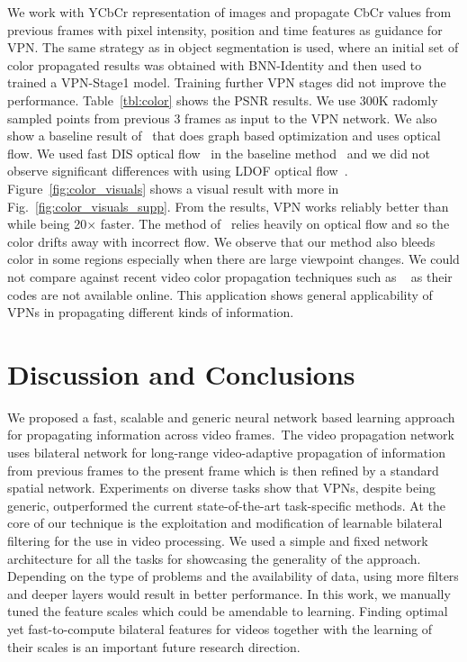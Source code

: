We work with YCbCr representation of images and propagate CbCr values from previous
frames with pixel intensity, position and time features as guidance for VPN.
The same strategy as in object segmentation is used, where an initial
set of color propagated results was obtained with BNN-Identity and then used to trained a VPN-Stage1 model.
Training further VPN stages did not improve the performance.
Table~\ref{tbl:color} shows the PSNR results.
We use 300K radomly sampled points from previous 3 frames as input
to the VPN network. We also show a baseline result of~\cite{levin2004colorization} that
does graph based optimization and uses optical flow. We used fast
DIS optical flow~\cite{kroeger2016fast} in the baseline method~\cite{levin2004colorization}
and we did not observe significant differences with using LDOF optical flow~\cite{brox2009large}.
Figure~\ref{fig:color_visuals} shows a visual result with more
in Fig.~\ref{fig:color_visuals_supp}.
From the results,
VPN works reliably better than~\cite{levin2004colorization} while being 20$\times$ faster.
The method of~\cite{levin2004colorization} relies heavily on optical flow
and so the color drifts away with incorrect flow. We observe that our method also bleeds color
in some regions especially when there are large viewpoint changes.
We could not compare against recent video color propagation techniques such as
~\cite{heu2009image,sheng2014video} as their codes are not available online.
This application shows general applicability of VPNs in propagating different
kinds of information.

\vspace{-0.3cm}
\section{Discussion and Conclusions}
\label{sec:conclusion}

We proposed a fast, scalable and generic neural network based learning approach
for propagating information across video frames.~The video propagation network uses
bilateral network for long-range video-adaptive propagation of information from previous
frames to the present frame which is then refined by a standard spatial network.
Experiments on diverse tasks show that VPNs, despite being generic, outperformed
the current state-of-the-art task-specific methods. At the core of our technique
is the exploitation and modification of learnable bilateral filtering for the use
in video processing. We used a simple and fixed network architecture for all the
tasks for showcasing the generality of the approach. Depending on the type of
problems and the availability of data, using more filters and deeper layers
would result in better performance. In this work, we manually tuned the feature scales which
could be amendable to learning. Finding optimal yet fast-to-compute bilateral features for
videos together with the learning of their scales is an important future
research direction.
